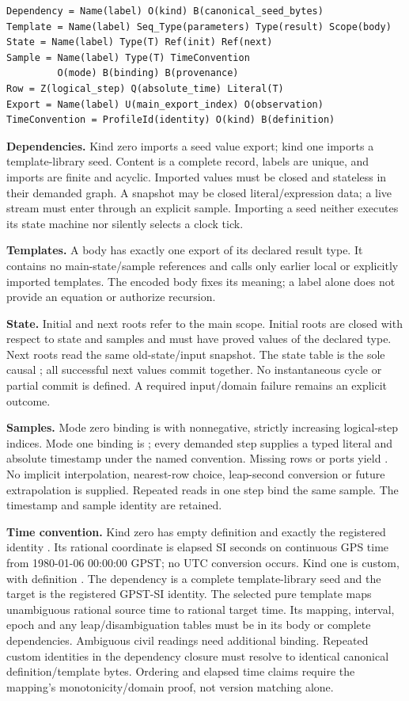 \begin{lstlisting}
Dependency = Name(label) O(kind) B(canonical_seed_bytes)
Template = Name(label) Seq_Type(parameters) Type(result) Scope(body)
State = Name(label) Type(T) Ref(init) Ref(next)
Sample = Name(label) Type(T) TimeConvention
         O(mode) B(binding) B(provenance)
Row = Z(logical_step) Q(absolute_time) Literal(T)
Export = Name(label) U(main_export_index) O(observation)
TimeConvention = ProfileId(identity) O(kind) B(definition)
\end{lstlisting}
\textbf{Dependencies.} Kind zero imports a seed value export; kind one imports
a template-library seed. Content is a complete  record, labels are
unique, and imports are finite and acyclic. Imported values must be closed and
stateless in their demanded graph. A snapshot may be closed literal/expression
data; a live stream must enter through an explicit sample. Importing a seed
neither executes its state machine nor silently selects a clock tick.

\textbf{Templates.} A body has exactly one export of its declared result type.
It contains no main-state/sample references and calls only earlier local or
explicitly imported templates. The encoded body fixes its meaning; a label alone
does not provide an equation or authorize recursion.

\textbf{State.} Initial and next roots refer to the main scope. Initial roots
are closed with respect to state and samples and must have proved values of
the declared type. Next roots read the same old-state/input snapshot. The state
table is the sole causal ; all successful next values commit together.
No instantaneous cycle or partial commit is defined. A required input/domain
failure remains an explicit outcome.

\textbf{Samples.} Mode zero binding is  with nonnegative,
strictly increasing logical-step indices. Mode one binding is
; every demanded step supplies a typed literal and
absolute timestamp under the named convention. Missing rows or ports yield
. No implicit interpolation, nearest-row choice, leap-second
conversion or future extrapolation is supplied. Repeated reads in one step bind
the same sample. The timestamp and sample identity are retained.

\textbf{Time convention.} Kind zero has empty definition and exactly the
registered identity . Its rational coordinate is
elapsed SI seconds on continuous GPS time from 1980-01-06 00:00:00 GPST; no UTC
conversion occurs. Kind one is custom, with definition
. The dependency is a complete
template-library seed and the target is the registered GPST-SI identity.
The selected pure template maps unambiguous rational source time to rational
target time. Its mapping, interval, epoch and any leap/disambiguation tables
must be in its body or complete dependencies. Ambiguous civil readings need
additional binding. Repeated custom identities in the dependency closure must
resolve to identical canonical definition/template bytes. Ordering and elapsed
time claims require the mapping's monotonicity/domain proof, not version
matching alone.

